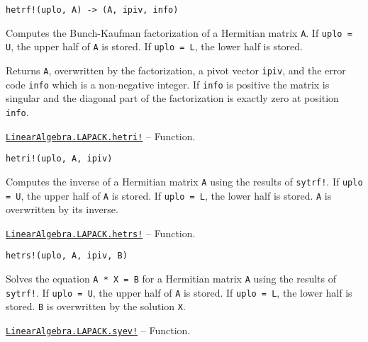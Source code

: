 \begin{adjustwidth}{2em}{0pt}


\begin{verbatim}
hetrf!(uplo, A) -> (A, ipiv, info)
\end{verbatim}

Computes the Bunch-Kaufman factorization of a Hermitian matrix \texttt{A}. If \texttt{uplo = U}, the upper half of \texttt{A} is stored. If \texttt{uplo = L}, the lower half is stored.

Returns \texttt{A}, overwritten by the factorization, a pivot vector \texttt{ipiv}, and the error code \texttt{info} which is a non-negative integer. If \texttt{info} is positive the matrix is singular and the diagonal part of the factorization is exactly zero at position \texttt{info}.



\end{adjustwidth}
\hypertarget{3196814042515994361}{}
\hyperlink{3196814042515994361}{\texttt{LinearAlgebra.LAPACK.hetri!}}  -- {Function.}

\begin{adjustwidth}{2em}{0pt}


\begin{verbatim}
hetri!(uplo, A, ipiv)
\end{verbatim}

Computes the inverse of a Hermitian matrix \texttt{A} using the results of \texttt{sytrf!}. If \texttt{uplo = U}, the upper half of \texttt{A} is stored. If \texttt{uplo = L}, the lower half is stored. \texttt{A} is overwritten by its inverse.



\end{adjustwidth}
\hypertarget{16647495205297911695}{}
\hyperlink{16647495205297911695}{\texttt{LinearAlgebra.LAPACK.hetrs!}}  -- {Function.}

\begin{adjustwidth}{2em}{0pt}


\begin{verbatim}
hetrs!(uplo, A, ipiv, B)
\end{verbatim}

Solves the equation \texttt{A * X = B} for a Hermitian matrix \texttt{A} using the results of \texttt{sytrf!}. If \texttt{uplo = U}, the upper half of \texttt{A} is stored. If \texttt{uplo = L}, the lower half is stored. \texttt{B} is overwritten by the solution \texttt{X}.



\end{adjustwidth}
\hypertarget{9979432299825280284}{}
\hyperlink{9979432299825280284}{\texttt{LinearAlgebra.LAPACK.syev!}}  -- {Function.}

